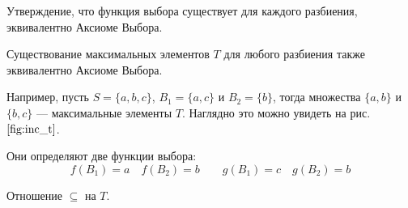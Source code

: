 Утверждение, что функция выбора существует для каждого разбиения,
эквивалентно Аксиоме Выбора.

Существование максимальных элементов $T$ для любого
разбиения также эквивалентно Аксиоме Выбора.

Например, пусть $S=\{a,b,c\}$, $B_1=\{a,c\}$ и $B_2=\{b\}$, тогда
множества $\{a,b\}$ и $\{b,c\}$ --- максимальные элементы $T$.
Наглядно это можно увидеть на рис. $\ref{fig:inc_t}$.

Они определяют две функции выбора:
\[
  f(B_1)=a\quad f(B_2)=b\qquad g(B_1)=c\quad g(B_2)=b
\]

\begin{marginfigure}
  \center

  \caption{Отношение $\subseteq$ на $T$.}\label{fig:inc_t}
\end{marginfigure}

